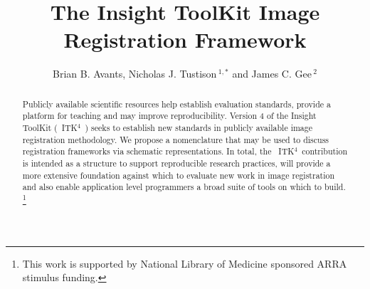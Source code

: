 \documentclass{frontiersSCNS}
\newcommand{\tk}{~ITK$^{\text{4}}$~}
\def\firstAuthorLast{Avants and Gee} %
\def\Authors{Brian B. Avants, Nicholas J. Tustison\,$^{1,*}$ and James C. Gee\,$^{2}$
 }
\begin{document}
\onecolumn
{}

\title[ITKv4 Image Registration]{The Insight ToolKit Image
  Registration Framework}
\author[\firstAuthorLast ]{\Authors}
\address{}
\correspondance{}
\editor{}
\topic{}

\maketitle

\begin{abstract}
Publicly available scientific resources help establish evaluation
standards, provide a platform for teaching and may improve reproducibility.
Version 4 of the Insight ToolKit (\tk) seeks to establish new
standards in publicly available image registration methodology.  We propose a nomenclature that may be used to
discuss registration frameworks via schematic representations.  In
total, the \tk contribution is intended as a structure to support
reproducible research practices, will provide a more extensive
foundation against which to evaluate new work in image registration
and also enable application level programmers a broad suite of tools
on which to build. \footnote{This
  work is supported by National Library of Medicine sponsored ARRA
  stimulus funding.}  
\end{abstract}
\end{document}
